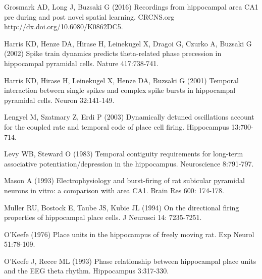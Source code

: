 \documentclass[12pt, letterpaper]{article}
\newenvironment{collapsable}{}{}
\begin{document}
\begin{collapsable}
  \vspace{12pt}

  \noindent Grosmark AD, Long J, Buzsaki G (2016) Recordings from hippocampal area CA1
  pre during and post novel spatial learning. CRCNS.org
  http://dx.doi.org/10.6080/K0862DC5.

  \vspace{12pt}

  \noindent Harris KD, Henze DA, Hirase H, Leinekugel X, Dragoi G, Czurko A, Buzsaki G
  (2002) Spike train dynamics predicts theta-related phase precession in
  hippocampal pyramidal cells. Nature 417:738-741.

  \vspace{12pt}

  \noindent Harris KD, Hirase H, Leinekugel X, Henze DA, Buzsaki G (2001) Temporal
  interaction between single spikes and complex spike bursts in hippocampal
  pyramidal cells. Neuron 32:141-149.

  \vspace{12pt}

  \noindent Lengyel M, Szatmary Z, Erdi P (2003) Dynamically detuned oscillations
  account for the coupled rate and temporal code of place cell firing.
  Hippocampus 13:700-714.

  \vspace{12pt}

  \noindent Levy WB, Steward O (1983) Temporal contiguity requirements for long-term
  associative potentiation/depression in the hippocampus. Neuroscience
  8:791-797.

  \vspace{12pt}

  \noindent Mason A (1993) Electrophysiology and burst-firing of rat subicular pyramidal
  neurons in vitro: a comparison with area CA1. Brain Res 600: 174-178.

  \vspace{12pt}

  \noindent Muller RU, Bostock E, Taube JS, Kubie JL (1994) On the directional firing
  properties of hippocampal place cells. J Neurosci 14: 7235-7251.

  \vspace{12pt}

  \noindent O'Keefe (1976) Place units in the hippocampus of freely moving rat. Exp
  Neurol 51:78-109.

  \vspace{12pt}

  \noindent O'Keefe J, Recce ML (1993) Phase relationship between hippocampal place
  units and the EEG theta rhythm. Hippocampus 3:317-330.


\end{collapsable}
\end{document}
